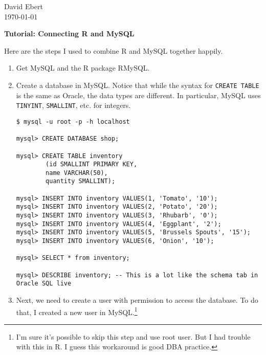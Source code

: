 \documentclass[11pt,oneside]{article}
\begin{document}


\begin{flushright}
David Ebert\\
\today \\
\end{flushright}

\begin{center}
\textbf{Tutorial: Connecting R and MySQL} \\
\end{center}

Here are the steps I used to combine R and MySQL together happily.

\begin{enumerate}

\item Get MySQL and the R package RMySQL.



\item Create a database in MySQL. Notice that while the syntax for \texttt{CREATE TABLE} is the same as Oracle, the data types are different. In particular, MySQL uses \texttt{TINYINT}, \texttt{SMALLINT}, etc. for integers.

\begin{verbatim}
$ mysql -u root -p -h localhost

mysql> CREATE DATABASE shop;

mysql> CREATE TABLE inventory
        (id SMALLINT PRIMARY KEY, 
        name VARCHAR(50),
        quantity SMALLINT);

mysql> INSERT INTO inventory VALUES(1, 'Tomato', '10');
mysql> INSERT INTO inventory VALUES(2, 'Potato', '20');
mysql> INSERT INTO inventory VALUES(3, 'Rhubarb', '0');
mysql> INSERT INTO inventory VALUES(4, 'Eggplant', '2');
mysql> INSERT INTO inventory VALUES(5, 'Brussels Spouts', '15');
mysql> INSERT INTO inventory VALUES(6, 'Onion', '10');

mysql> SELECT * from inventory;

mysql> DESCRIBE inventory; -- This is a lot like the schema tab in Oracle SQL live
\end{verbatim}




\item Next, we need to create a user with permission to access the database. To do that, I created a new user in MySQL.\footnote{I'm sure it's possible to skip this step and use root user. But I had trouble with this in R. I guess this workaround is good DBA practice.} 


\end{enumerate}
\end{document}
